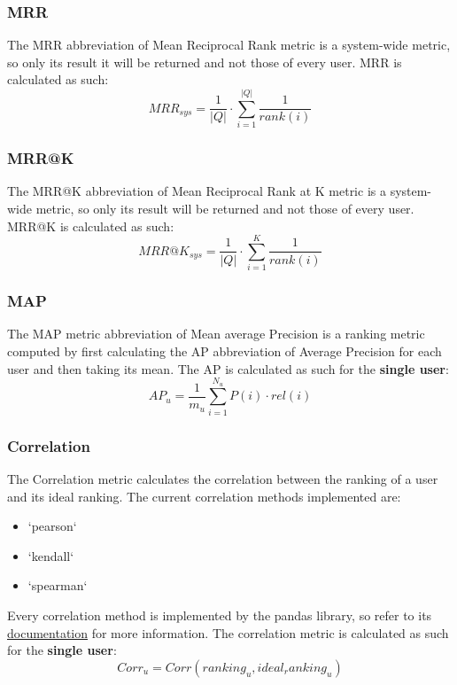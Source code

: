 \documentclass[11pt]{article}
\begin{document}
\subsubsection{MRR}\label{subsubsec:mrr}
The MRR abbreviation of Mean Reciprocal Rank metric is a system-wide metric, so only its result it will be returned
and not those of every user.
MRR is calculated as such:
\hfill\break
\hfill\break
    \[
        MRR_{sys} = \frac{1}{|Q|}\cdot\sum_{i=1}^{|Q|}\frac{1}{rank(i)}
    \]
\hfill\break


\subsubsection{MRR@K}\label{subsubsec:mrr-k}
The MRR@K abbreviation of Mean Reciprocal Rank at K metric is a system-wide metric, so only its result will be returned
and not those of every user.
MRR@K is calculated as such:
\hfill\break
\hfill\break
    \[
        MRR@K_{sys} = \frac{1}{|Q|}\cdot\sum_{i=1}^{K}\frac{1}{rank(i)}
    \]
\hfill\break


\subsubsection{MAP}\label{subsubsec:map}
The MAP metric abbreviation of Mean average Precision is a ranking metric computed by first calculating the AP
abbreviation of Average Precision for each user and then taking its mean.
The AP is calculated as such for the \textbf{single user}:
\hfill\break
\hfill\break
    \[
        AP_u = \frac{1}{m_u}\sum_{i=1}^{N_u}P(i)\cdot rel(i)
    \]
\hfill\break



\subsubsection{Correlation}\label{subsubsec:corr}
The Correlation metric calculates the correlation between the ranking of a user and its ideal ranking.
The current correlation methods implemented are:
\begin{itemize}
    \item `pearson`
    \item `kendall`
    \item `spearman`
\end{itemize}
\hfill\break
\hfill\break
Every correlation method is implemented by the pandas library, so refer to its
\href{https://pandas.pydata.org/docs/reference/api/pandas.Series.corr.html}{documentation} for more information.
\hfill\break
\hfill\break
The correlation metric is calculated as such for the \textbf{single user}:
\hfill\break
\hfill\break
    \[
        Corr_u = Corr(ranking_u, ideal_ranking_u)
    \]
\hfill\break
\end{document}
